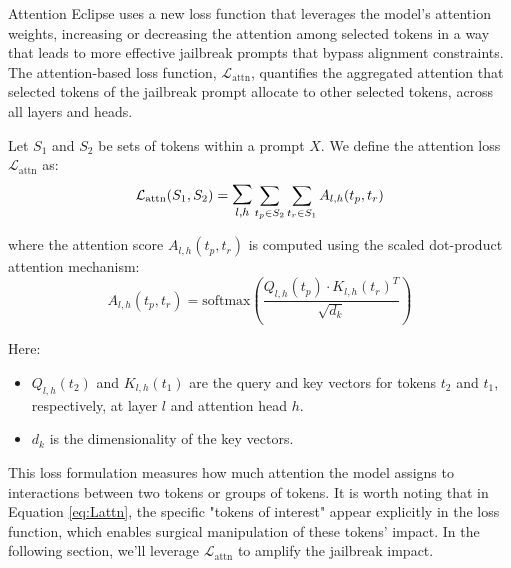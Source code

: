 Attention Eclipse uses a new loss function that leverages the model's attention weights, increasing or decreasing the attention among selected tokens in a way that leads to more effective jailbreak prompts that bypass alignment constraints. The attention-based loss function, $\mathcal{L}_{\text{attn}}$, quantifies the aggregated attention that selected tokens of the jailbreak prompt allocate to other selected tokens, across all layers and heads.

Let $S_1$ and $S_2$ be sets of tokens within a prompt $X$. We define the attention loss $\mathcal{L}_{\text{attn}}$ as:
\begin{equation}\label{eq:Lattn}
\mathcal{L}_{\text{attn}}(S_1, S_2) = \mathlarger{\mathlarger{\sum}}_{l, h } \sum_{t_p \in S_2} \sum_{t_r \in S_1} A_{l,h}(t_p, t_r)
\end{equation}

\noindent
where the attention score $A_{l,h}(t_p, t_r)$ is computed using the scaled dot-product attention mechanism:
\begin{equation}
A_{l,h}(t_p, t_r) = \text{softmax} \left( \frac{Q_{l,h}(t_p) \cdot K_{l,h}(t_r)^T}{\sqrt{d_k}} \right)
\end{equation}

\noindent 
Here:
\begin{itemize}
    \setlength{\itemsep}{0in} 
    \item \( Q_{l,h}(t_2) \) and \( K_{l,h}(t_1) \) are the query and key vectors for tokens \( t_2 \) and \( t_1 \), respectively, at layer \( l \) and attention head \( h \).
    \item \( d_k \) is the dimensionality of the key vectors.
\end{itemize}

 This loss formulation measures how much attention the model assigns to interactions between two tokens or groups of tokens. It is worth noting that in Equation \ref{eq:Lattn}, the specific "tokens of interest" appear explicitly in the loss function, which enables surgical manipulation of these tokens' impact. In the following section, we'll leverage $\mathcal{L}_{\text{attn}}$ to amplify the jailbreak impact.   %


